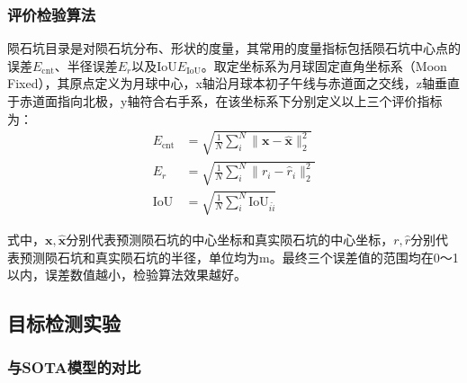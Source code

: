 \subsubsection{评价检验算法}
陨石坑目录是对陨石坑分布、形状的度量，其常用的度量指标包括陨石坑中心点的误差$E_\mathrm{cnt}$、半径误差$E_r$以及IoU$E_\mathrm{IoU}$\cite{liuIdentificationLunarCraters2024}。取定坐标系为月球固定直角坐标系（Moon Fixed），其原点定义为月球中心，x轴沿月球本初子午线与赤道面之交线，z轴垂直于赤道面指向北极，y轴符合右手系，在该坐标系下分别定义以上三个评价指标为：
\begin{align}
  E_\mathrm{cnt}&=\sqrt{\frac{1}{N}\sum_i^N\|\mathbf{x}-\hat{\mathbf{x}}\|_2^2}\\
  E_r&=\sqrt{\frac{1}{N}\sum_i^N\|r_i-\hat{r}_i\|_2^2}\\
  \mathrm{IoU}&=\sqrt{\frac{1}{N}\sum_i^N\mathrm{IoU}_{i\hat{i}}}
\end{align}\par
式中，$\mathbf{x},\hat{\mathbf{x}}$分别代表预测陨石坑的中心坐标和真实陨石坑的中心坐标，$r,\hat{r}$分别代表预测陨石坑和真实陨石坑的半径，单位均为m。最终三个误差值的范围均在0～1以内，误差数值越小，检验算法效果越好。
\subsection{目标检测实验}
\subsubsection{与SOTA模型的对比}

